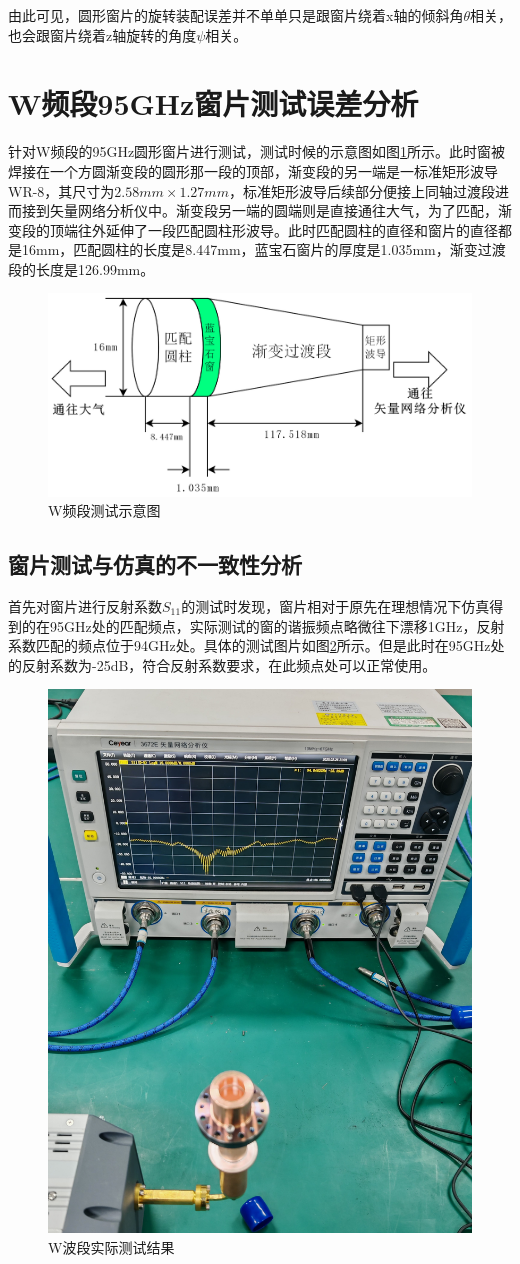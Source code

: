\documentclass[master]{thesis-uestc}
\begin{document}
由此可见，圆形窗片的旋转装配误差并不单单只是跟窗片绕着x轴的倾斜角$\theta$相关，也会跟窗片绕着z轴旋转的角度$\psi$相关。

\section{W频段95GHz窗片测试误差分析}
针对W频段的95GHz圆形窗片进行测试，测试时候的示意图如图\ref{fig:W频段测试示意图}所示。此时窗被焊接在一个方圆渐变段的圆形那一段的顶部，渐变段的另一端是一标准矩形波导WR-8，其尺寸为$2.58mm \times 1.27mm$，标准矩形波导后续部分便接上同轴过渡段进而接到矢量网络分析仪中。渐变段另一端的圆端则是直接通往大气，为了匹配，渐变段的顶端往外延伸了一段匹配圆柱形波导。此时匹配圆柱的直径和窗片的直径都是16mm，匹配圆柱的长度是8.447mm，蓝宝石窗片的厚度是1.035mm，渐变过渡段的长度是126.99mm。
\begin{figure}[!htb]
    \centering
    \includegraphics[width=0.5\linewidth]{pic/chapter5/W频段测试示意图.png}
    \caption{W频段测试示意图}
    \label{fig:W频段测试示意图}
\end{figure}

\subsection{窗片测试与仿真的不一致性分析}
首先对窗片进行反射系数$S_{11}$的测试时发现，窗片相对于原先在理想情况下仿真得到的在95GHz处的匹配频点，实际测试的窗的谐振频点略微往下漂移1GHz，反射系数匹配的频点位于94GHz处。具体的测试图片如图\ref{fig:W波段实际测试结果}所示。但是此时在95GHz处的反射系数为-25dB，符合反射系数要求，在此频点处可以正常使用。
\begin{figure}[!htb]
    \centering
    \includegraphics[width=0.35\linewidth]{pic/chapter5/实际测试的W波导窗.jpg}
    \caption{W波段实际测试结果}
    \label{fig:W波段实际测试结果}
\end{figure}
\end{document}
